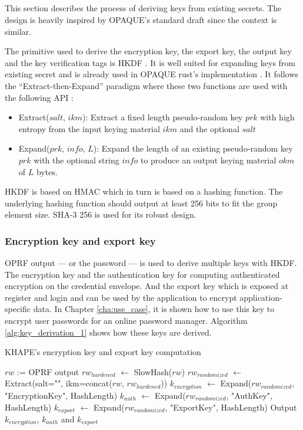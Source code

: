 ﻿\documentclass[../report.tex]{subfiles}
\begin{document}
\subsection{}
This section describes the process of deriving keys from existing secrets. The design is heavily inspired by OPAQUE's standard draft \cite{OPAQUE_Standard_Draft} since the context is similar.

The primitive used to derive the encryption key, the export key, the output key and the key verification tags is HKDF \cite{HKDF_RFC}. It is well suited for expanding keys from existing secret and is already used in OPAQUE rust's implementation \cite{OPAQUE_KE_lib}. It follows the ``Extract-then-Expand'' paradigm where these two functions are used with the following API :
\begin{itemize}
 \item Extract($salt$, $ikm$): Extract a fixed length pseudo-random key $prk$ with high entropy from the input keying material $ikm$ and the optional $salt$
 \item Expand($prk$, $info$, $L$): Expand the length of an existing pseudo-random key $prk$ with the optional string $info$ to produce an output keying material $okm$ of $L$ bytes.
\end{itemize}
HKDF is based on HMAC which in turn is based on a hashing function. The underlying hashing function should output at least 256 bits to fit the group element size. SHA-3 256 is used for its robust design.

\subsubsection{Encryption key and export key}
\label{sec:encryption_key}
OPRF output --- or the password --- is used to derive multiple keys with HKDF. The encryption key and the authentication key for computing authenticated encryption on the credential envelope. And the export key which is exposed at register and login and can be used by the application to encrypt application-specific data. In Chapter \ref{cha:use_case}, it is shown how to use this key to encrypt user passwords for an online password manager.
Algorithm \ref{alg:key_derivation_1} shows how these keys are derived.
\begin{algorithm}
\caption{KHAPE's encryption key and export key computation}
\label{alg:key_derivation_1}
\begin{algorithmic}
\Require $rw$ := OPRF output
\State $rw_{hardened}$ $\gets$ SlowHash($rw$)
\State $rw_{randomized}$ $\gets$ Extract(salt="", ikm=concat($rw$, $rw_{hardened}$))
\State $k_{encryption}$ $\gets$ Expand($rw_{randomized}$, "EncryptionKey", HashLength)
\State $k_{auth}$ $\gets$ Expand($rw_{randomized}$, "AuthKey", HashLength)
\State $k_{export}$ $\gets$ Expand($rw_{randomized}$, "ExportKey", HashLength)
\State Output $k_{encryption}$, $k_{auth}$ and $k_{export}$
\end{algorithmic}
\end{algorithm}
\end{document}
